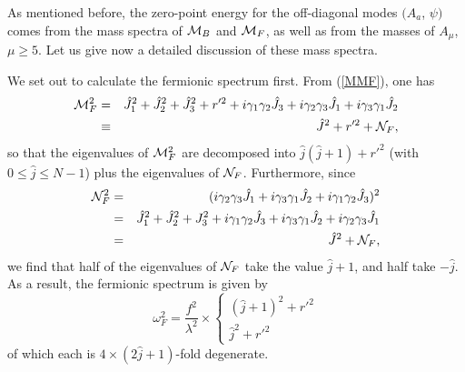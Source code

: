 \documentclass[a4paper,12pt]{article}
\begin{document}
{As mentioned before, the zero-point energy for the off-diagonal modes $(A_{a}$, $\psi)$ comes from the mass spectra of ${\cal M}_{B}$ and ${\cal M}_{F}$, as well as from the masses of $A_{\mu}$, $\mu\geq 5$. Let us give now a detailed discussion of these mass spectra.

We set out to calculate the fermionic spectrum first. From (\ref{MMF}), one has
\begin{eqnarray}
{\cal M}_{F}^{2} &=& \hat{J}^{2}_{1} + \hat{J}^{2}_{2} + \hat{J}^{2}_{3}+ r'^{2} + i\gamma_{1} \gamma_{2} \hat{J}_{3} 
    + i\gamma_{2} \gamma_{3} \hat{J}_{1} + i\gamma_{3} \gamma_{1} \hat{J}_{2}\nonumber\\
      &\equiv& \hat{J}^{2} + r'^{2} + {\cal N}_{F},
\label{FM}
\end{eqnarray}
so that the eigenvalues of ${\cal M}_{F}^{2}$ are decomposed into  $\hat{j}(\hat{j}+1)+r'^{2}$ (with $0\leq\hat{j}\leq N-1$) plus the eigenvalues of ${\cal N}_{F}$. Furthermore, since
\begin{eqnarray}
{\cal N}_{F}^{2} &=& (i\gamma_{2} \gamma_{3} \hat{J}_{1} +
                                 i\gamma_{3} \gamma_{1} \hat{J}_{2} +
                                 i\gamma_{1} \gamma_{2} \hat{J}_{3})^2\nonumber\\
                            &=& \hat{J}^{2}_{1} + \hat{J}^{2}_{2} + {J}^{2}_{3} +    i\gamma_{1} \gamma_{2} \hat{J}_{3} + 
                                 i\gamma_{3} \gamma_{1} \hat{J}_{2} + 
                                 i\gamma_{2} \gamma_{3} \hat{J}_{1}\nonumber\\
                            &=& \hat{J}^{2} + {\cal N}_{F},\nonumber                                
\end{eqnarray}
we find that half of the eigenvalues of ${\cal N}_{F}$ take the value $\hat{j}+1$, and half take $-\hat{j}$. As a result, the fermionic spectrum is given by
\begin{equation}
\omega_{F}^{2}=\frac{f^{2}}{\lambda^{2}}\times
\left\{
             \begin{array}{l}
                 (\hat{j}+1)^{2} + r'^{2}   \\             
                 \hat{j}^{2} + r'^{2}
             \end{array}
          \right.
\label{specF}
\end{equation}
of which each is $4\times (2\hat{j}+1)$-fold degenerate.

}
\end{document}
